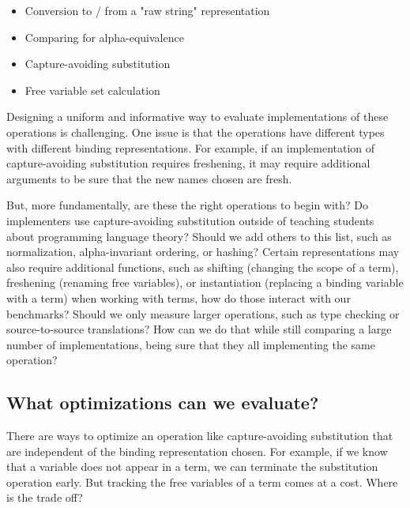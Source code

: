 \documentclass[sigplan]{acmart}
\begin{document}
\begin{itemize}
 \item Conversion to / from a "raw string" representation 
  
  \item Comparing for alpha-equivalence

  \item Capture-avoiding substitution %

  \item Free variable set calculation
\end{itemize}

Designing a uniform and informative way to evaluate implementations of these
operations is challenging. One issue is that the operations have different
types with different binding representations. For example, if an
implementation of capture-avoiding substitution requires freshening, it may
require additional arguments to be sure that the new names chosen are
fresh.

But, more fundamentally, are these the right operations to begin with?  Do
implementers use capture-avoiding substitution outside of teaching students
about programming language theory? Should we add others to this list, such as
normalization, alpha-invariant ordering, or hashing? Certain representations
may also require additional functions, such as shifting (changing the scope of
a term), freshening (renaming free variables), or instantiation (replacing a
binding variable with a term) when working with terms, how do those interact
with our benchmarks?  Should we only measure larger operations, such as type
checking or source-to-source translations? How can we do that while still
comparing a large number of implementations, being sure that they all
implementing the same operation?

\subsection{What optimizations can we evaluate?}

There are ways to optimize an operation like capture-avoiding substitution
that are independent of the binding representation chosen.  For example, if we
know that a variable does not appear in a term, we can terminate the
substitution operation early. But tracking the free variables of a term comes
at a cost. Where is the trade off?
\end{document}
